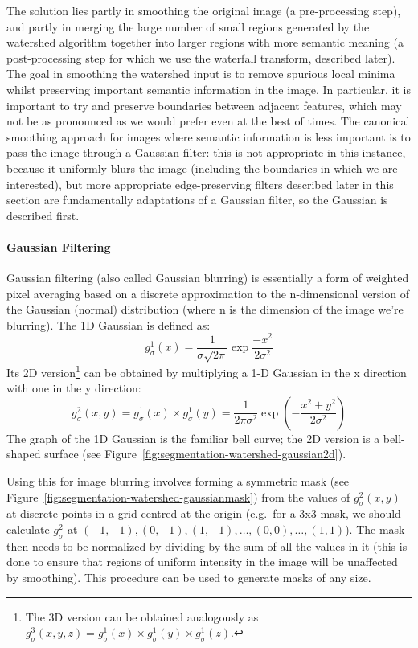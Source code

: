 The solution lies partly in smoothing the original image (a pre-processing step), and partly in merging the large number of small regions generated by the watershed algorithm together into larger regions with more semantic meaning (a post-processing step for which we use the waterfall transform, described later). The goal in smoothing the watershed input is to remove spurious local minima whilst preserving important semantic information in the image. In particular, it is important to try and preserve boundaries between adjacent features, which may not be as pronounced as we would prefer even at the best of times. The canonical smoothing approach for images where semantic information is less important is to pass the image through a Gaussian filter: this is not appropriate in this instance, because it uniformly blurs the image (including the boundaries in which we are interested), but more appropriate edge-preserving filters described later in this section are fundamentally adaptations of a Gaussian filter, so the Gaussian is described first.

\paragraph{Gaussian Filtering}

Gaussian filtering (also called Gaussian blurring) is essentially a form of weighted pixel averaging based on a discrete approximation to the n-dimensional version of the Gaussian (normal) distribution (where n is the dimension of the image we're blurring). The 1D Gaussian is defined as:
%
\[
g_\sigma^1(x) = \frac{1}{\sigma\sqrt{2\pi}} \exp \frac{-x^2}{2\sigma^2}
\]
%
Its 2D version\footnote{The 3D version can be obtained analogously as $g_\sigma^3(x,y,z) = g_\sigma^1(x) \times g_\sigma^1(y) \times g_\sigma^1(z)$.} can be obtained by multiplying a 1-D Gaussian in the x direction with one in the y direction:
%
\[
g_\sigma^2(x,y) = g_\sigma^1(x) \times g_\sigma^1(y) = \frac{1}{2\pi\sigma^2} \exp \left( -\frac{x^2+y^2}{2\sigma^2} \right)
\]
%
The graph of the 1D Gaussian is the familiar bell curve; the 2D version is a bell-shaped surface (see Figure~\ref{fig:segmentation-watershed-gaussian2d}).


Using this for image blurring involves forming a symmetric mask (see Figure~\ref{fig:segmentation-watershed-gaussianmask}) from the values of $g_\sigma^2(x,y)$ at discrete points in a grid centred at the origin (e.g.~for a 3x3 mask, we should calculate $g_\sigma^2$ at $(-1,-1), (0,-1), (1,-1), \ldots, (0,0), \ldots, (1,1)$). The mask then needs to be normalized by dividing by the sum of all the values in it (this is done to ensure that regions of uniform intensity in the image will be unaffected by smoothing). This procedure can be used to generate masks of any size.


